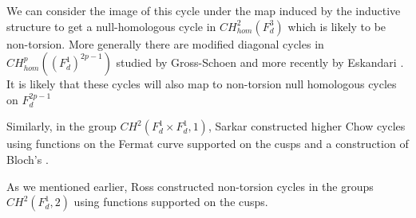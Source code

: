\documentclass[12pt,reqno]{article}
\begin{document}
We can consider the image of this cycle under the map induced by the inductive structure to get a null-homologous cycle in $CH^2_{hom}(F_d^3)$ which is likely to be non-torsion. More generally there are modified diagonal cycles in $CH^p_{hom}((F_d^1)^{2p-1})$ studied by Gross-Schoen \cite{grsc} and more recently by Eskandari \cite{eska}. It is likely that these cycles will also map to non-torsion null homologous cycles on $F_d^{2p-1}$ 

Similarly, in the group $CH^2(F^1_d \times F^1_d,1)$, Sarkar \cite{sark} constructed higher Chow cycles using functions on the Fermat curve supported on the cusps and a construction of Bloch's \cite{blocirvine}.

As we mentioned earlier, Ross \cite{ross} constructed non-torsion cycles in the groups $CH^2(F_d^1,2)$ using functions supported on the cusps. 


























		
\end{document}
